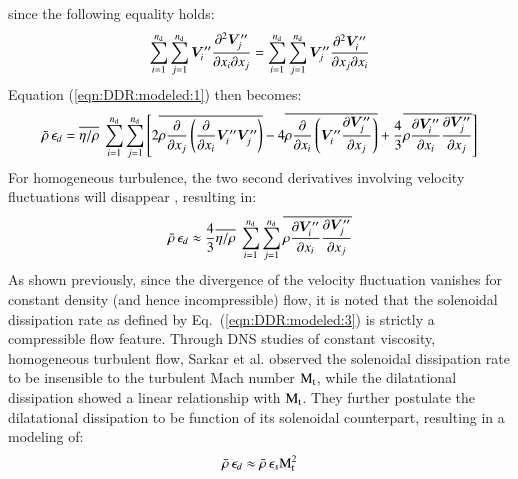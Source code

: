 \documentclass{warpdoc}
\newcommand{\nd}{{{n}_{\rm d}}}
\newcommand{\turb}{_{\rm t}}
\newcommand{\mfd}{\displaystyle}
\begin{document}
%
since the following equality holds:
%
\begin{displaymath}
  \mfd\sum_{i=1}^\nd \sum_{j=1}^\nd
     \bm{V}_i^{{\prime\prime}}\frac{\partial^2 \bm{V}_j^{{\prime\prime}}}{\partial x_i \partial x_j}
 = \mfd\sum_{i=1}^\nd \sum_{j=1}^\nd
     \bm{V}_j^{{\prime\prime}}\frac{\partial^2 \bm{V}_i^{{\prime\prime}}}{\partial x_j \partial x_i}
\end{displaymath}
%
Equation (\ref{eqn:DDR:modeled:1}) then becomes:
%
\begin{equation}
 \wbar{\rho}\, \epsilon_d = 
    \overline{\eta/\rho}~ \sum_{i=1}^\nd \sum_{j=1}^\nd
    \left[
        2 \overline{\rho \frac{\partial }{\partial x_j} \left( \frac{\partial}{\partial x_i}\bm{V}_i^{{\prime\prime}}  \bm{V}_j^{{\prime\prime}}\right)}
       -4 \overline{ \rho \frac{\partial }{\partial x_i} \left( \bm{V}_i^{{\prime\prime}} \frac{\partial \bm{V}_j^{{\prime\prime}}}{\partial x_j}   \right)}
       +\frac{4}{3} \overline{ \rho \frac{\partial \bm{V}_i^{{\prime\prime}}}{\partial x_i}  \frac{\partial \bm{V}_j^{{\prime\prime}}}{\partial x_j}}
    \right]
 \label{eqn:DDR:modeled:2}
\end{equation}
%
For homogeneous turbulence, the two second derivatives involving velocity fluctuations
will disappear \cite{turb:sarkar1991}, resulting in:
%
\begin{equation}
 \wbar{\rho}\, \epsilon_d \approx 
    \frac{4}{3} \overline{\eta/\rho}~ \sum_{i=1}^\nd \sum_{j=1}^\nd
        \overline{ \rho \frac{\partial \bm{V}_i^{{\prime\prime}}}{\partial x_i}  \frac{\partial \bm{V}_j^{{\prime\prime}}}{\partial x_j}}
 \label{eqn:DDR:modeled:3}
\end{equation}
%
As shown previously, since the divergence of the velocity fluctuation vanishes for constant density (and hence incompressible)
flow, it is noted that the solenoidal dissipation rate as defined by Eq.\ (\ref{eqn:DDR:modeled:3}) is strictly a compressible flow feature.
Through DNS studies of constant viscosity, homogeneous
turbulent flow, Sarkar et al. observed  the solenoidal dissipation rate to be insensible
to the turbulent Mach number ${\rm M}\turb$, while the dilatational dissipation
showed a linear relationship with ${\rm M}\turb$. They further postulate the dilatational
dissipation to be function of its solenoidal counterpart, resulting in a
modeling of:
%
\begin{equation}
 \wbar{\rho}\, \epsilon_d \approx 
    \wbar{\rho}\, \epsilon_s {\rm M}\turb^2
 \label{eqn:DDR:modeled:sarkar}
\end{equation}
\end{document}
